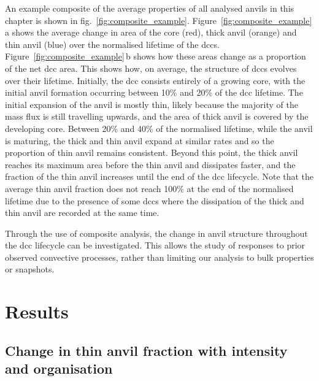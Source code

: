 An example composite of the average properties of all analysed anvils in this chapter is shown in fig.~\ref{fig:composite_example}.
Figure~\ref{fig:composite_example}\,a shows the average change in area of the core (red), thick anvil (orange) and thin anvil (blue) over the normalised lifetime of the \acrshort{dcc}s.
Figure~\ref{fig:composite_example}\,b shows how these areas change as a proportion of the net \acrshort{dcc} area.
This shows how, on average, the structure of \acrshort{dcc}s evolves over their lifetime.
Initially, the \acrshort{dcc} consists entirely of a growing core, with the initial anvil formation occurring between 10\% and 20\% of the \acrshort{dcc} lifetime.
The initial expansion of the anvil is mostly thin, likely because the majority of the mass flux is still travelling upwards, and the area of thick anvil is covered by the developing core.
Between 20\% and 40\% of the normalised lifetime, while the anvil is maturing, the thick and thin anvil expand at similar rates and so the proportion of thin anvil remains consistent.
Beyond this point, the thick anvil reaches its maximum area before the thin anvil and dissipates faster, and the fraction of the thin anvil increases until the end of the \acrshort{dcc} lifecycle.
Note that the average thin anvil fraction does not reach 100\% at the end of the normalised lifetime due to the presence of some \acrshort{dcc}s where the dissipation of the thick and thin anvil are recorded at the same time.

Through the use of composite analysis, the change in anvil structure throughout the \acrshort{dcc} lifecycle can be investigated. 
This allows the study of responses to prior observed convective processes, rather than limiting our analysis to bulk properties or snapshots.

\section{Results}

\subsection{Change in thin anvil fraction with intensity and organisation}

